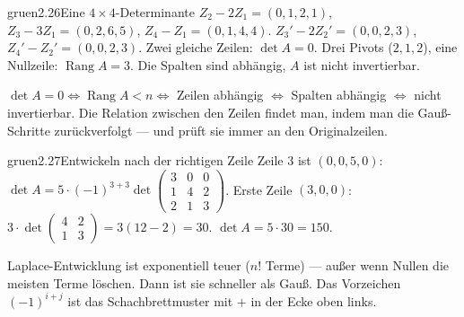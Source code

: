\begin{loesungkarte}{gruen}{2.26}{Eine $4\times4$-Determinante}
$Z_2 - 2Z_1 = (0, 1, 2, 1)$, $Z_3 - 3Z_1 = (0, 2, 6, 5)$, $Z_4 - Z_1 = (0, 1, 4, 4)$.
$Z_3' - 2Z_2' = (0, 0, 2, 3)$, $Z_4' - Z_2' = (0, 0, 2, 3)$. Zwei gleiche Zeilen: $\det A = 0$.
Drei Pivots ($2, 1, 2$), eine Nullzeile: $\operatorname{Rang}A = 3$. Die Spalten sind abhängig, $A$ ist nicht invertierbar.
\begin{mitnehmen}\kastentext
$\det A = 0\iff\operatorname{Rang}A < n\iff$ Zeilen abhängig $\iff$ Spalten abhängig $\iff$ nicht invertierbar. Die Relation zwischen den Zeilen findet man, indem man die Gauß-Schritte zurückverfolgt --- und prüft sie immer an den Originalzeilen.
\end{mitnehmen}
\end{loesungkarte}

\begin{loesungkarte}{gruen}{2.27}{Entwickeln nach der richtigen Zeile}
Zeile 3 ist $(0, 0, 5, 0)$: $\det A = 5\cdot(-1)^{3+3}\det\begin{pmatrix}3 & 0 & 0\\ 1 & 4 & 2\\ 2 & 1 & 3\end{pmatrix}$.
Erste Zeile $(3, 0, 0)$: $3\cdot\det\begin{pmatrix}4 & 2\\ 1 & 3\end{pmatrix} = 3(12 - 2) = 30$.
$\det A = 5\cdot30 = 150$.
\begin{mitnehmen}\kastentext
Laplace-Entwicklung ist exponentiell teuer ($n!$ Terme) --- außer wenn Nullen die meisten Terme löschen. Dann ist sie schneller als Gauß. Das Vorzeichen $(-1)^{i+j}$ ist das Schachbrettmuster mit $+$ in der Ecke oben links.
\end{mitnehmen}
\end{loesungkarte}

